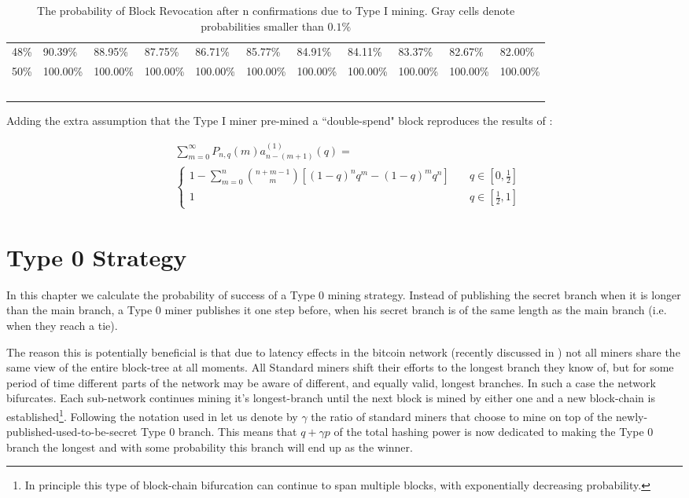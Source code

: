 \documentclass[letterpaper,12pt]{report}
\begin{document}
\begin{table}
{\begin{tabular}{l|llllllllll}
    48\% & 90.39\% & 88.95\% & 87.75\% & 86.71\% & 85.77\% & 84.91\% & 84.11\% & 83.37\% & 82.67\% & 82.00\% \\
    50\% & 100.00\% & 100.00\% & 100.00\% & 100.00\% & 100.00\% & 100.00\% & 100.00\% & 100.00\% & 100.00\% & 100.00\% \\
    ~   & ~       & ~       & ~       & ~       & ~       & ~       & ~       & ~       & ~       & ~       \\
    \end{tabular}
    }
    \caption {The probability of Block Revocation after n confirmations due to Type I mining. Gray cells denote probabilities smaller than $0.1\%$}
\end{table}

Adding the extra assumption that the Type I miner pre-mined a ``double-spend" block reproduces the results of \cite{Doublespend}:


\begin{eqnarray}\label{eq:ds}
&\sum_{m=0}^{\infty}\mathit{P}_{n,q}(m)\mathit{a}^{(1)}_{n-(m+1)}(q)=\\
&\begin{cases}
1-\sum_{m=0}^n{n + m -1\choose m}\left[(1-q)^nq^m-(1-q)^mq^n\right] & \quad q \in [0,\frac{1}{2}] \\
1 & \quad q \in [\frac{1}{2},1] 
\end{cases}
\end{eqnarray}


\chapter{Type 0 Strategy}

In this chapter we calculate the probability of success of a Type 0 mining strategy.
Instead of publishing the secret branch when it is longer than the main branch, a Type 0 miner publishes it one step before, when his secret branch is of the same length as the main branch (i.e. when they reach a tie). 

The reason this is potentially beneficial is that due to latency effects in the bitcoin network (recently discussed in \cite{Zoharetal}) not all miners share the same view of the entire block-tree at all moments. All Standard miners shift their efforts to the longest branch they know of, but for some period of time different parts of the network may be aware of different, and equally valid, longest branches. In such a case the network bifurcates. Each sub-network continues mining it's longest-branch until the next block is mined by either one and a new block-chain is established\footnote{In principle this type of block-chain bifurcation can continue to span multiple blocks, with exponentially decreasing probability.}. 
Following the notation used in \cite{Selfish} let us denote by $\gamma$ the ratio of standard miners that choose to mine on top of the newly-published-used-to-be-secret Type 0 branch.
This means that $q+\gamma p$ of the total hashing power is now dedicated to making the Type 0 branch the longest and with some probability this branch will end up as the winner. 
\end{document}
